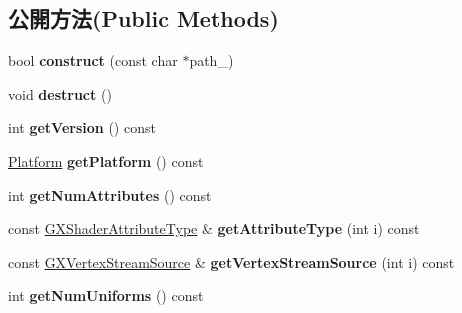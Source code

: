 \subsection*{公開方法(Public Methods)}
\begin{DoxyCompactItemize}
\item 
bool {\bfseries construct} (const char $\ast$path\+\_\+)\hypertarget{class_magnum_1_1_visual_effect_a5e2a540177bacc1d3f6c787bfd30871c}{}\label{class_magnum_1_1_visual_effect_a5e2a540177bacc1d3f6c787bfd30871c}

\item 
void {\bfseries destruct} ()\hypertarget{class_magnum_1_1_visual_effect_a5ee964eb71ea32b1102215ea829e1ef2}{}\label{class_magnum_1_1_visual_effect_a5ee964eb71ea32b1102215ea829e1ef2}

\item 
int {\bfseries get\+Version} () const \hypertarget{class_magnum_1_1_visual_effect_a0a40425cee2002bd62ad3de40e45ffa8}{}\label{class_magnum_1_1_visual_effect_a0a40425cee2002bd62ad3de40e45ffa8}

\item 
\hyperlink{class_magnum_1_1_platform}{Platform} {\bfseries get\+Platform} () const \hypertarget{class_magnum_1_1_visual_effect_a2dc0c7cbd7aa0872216f28c9b5f2dc9f}{}\label{class_magnum_1_1_visual_effect_a2dc0c7cbd7aa0872216f28c9b5f2dc9f}

\item 
int {\bfseries get\+Num\+Attributes} () const \hypertarget{class_magnum_1_1_visual_effect_afd5d7998b37431fbb54bd3e3f7262334}{}\label{class_magnum_1_1_visual_effect_afd5d7998b37431fbb54bd3e3f7262334}

\item 
const \hyperlink{class_magnum_1_1_g_x_shader_attribute_type}{G\+X\+Shader\+Attribute\+Type} \& {\bfseries get\+Attribute\+Type} (int i) const \hypertarget{class_magnum_1_1_visual_effect_a06a192c01a6328ee2e22579347297fdf}{}\label{class_magnum_1_1_visual_effect_a06a192c01a6328ee2e22579347297fdf}

\item 
const \hyperlink{class_magnum_1_1_g_x_vertex_stream_source}{G\+X\+Vertex\+Stream\+Source} \& {\bfseries get\+Vertex\+Stream\+Source} (int i) const \hypertarget{class_magnum_1_1_visual_effect_aae5a0f4d63258f2d999a584c07d1013e}{}\label{class_magnum_1_1_visual_effect_aae5a0f4d63258f2d999a584c07d1013e}

\item 
int {\bfseries get\+Num\+Uniforms} () const \hypertarget{class_magnum_1_1_visual_effect_a8f86ce863718c8e062a76a024b29140b}{}\label{class_magnum_1_1_visual_effect_a8f86ce863718c8e062a76a024b29140b}


\end{DoxyCompactItemize}

